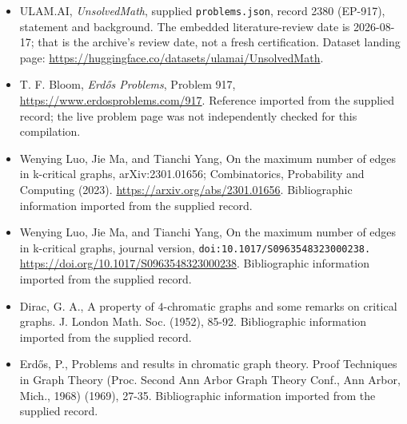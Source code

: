 \documentclass[11pt,a4paper]{article}
\begin{document}
{\small

\begin{itemize}

\item[\hypertarget{source:2380:1}{S1}] ULAM.AI, \emph{UnsolvedMath}, supplied \texttt{problems.json}, record 2380 (EP-917), statement and background. The embedded literature-review date is 2026-08-17; that is the archive’s review date, not a fresh certification. Dataset landing page: \url{https://huggingface.co/datasets/ulamai/UnsolvedMath}.

\item[\hypertarget{source:2380:2}{S2}] T. F. Bloom, \emph{Erdős Problems}, Problem 917, \url{https://www.erdosproblems.com/917}. Reference imported from the supplied record; the live problem page was not independently checked for this compilation.

\item[\hypertarget{source:2380:3}{S3}] Wenying Luo, Jie Ma, and Tianchi Yang, On the maximum number of edges in k-critical graphs, arXiv:2301.01656; Combinatorics, Probability and Computing (2023). \url{https://arxiv.org/abs/2301.01656}. Bibliographic information imported from the supplied record.

\item[\hypertarget{source:2380:4}{S4}] Wenying Luo, Jie Ma, and Tianchi Yang, On the maximum number of edges in k-critical graphs, journal version, \nolinkurl{doi:10.1017/S0963548323000238.} \url{https://doi.org/10.1017/S0963548323000238}. Bibliographic information imported from the supplied record.

\item[\hypertarget{source:2380:5}{S5}] Dirac, G. A., A property of {$4$}-chromatic graphs and some remarks on critical graphs. J. London Math. Soc. (1952), 85-92. Bibliographic information imported from the supplied record.

\item[\hypertarget{source:2380:6}{S6}] Erd\H{o}s, P., Problems and results in chromatic graph theory. Proof Techniques in Graph Theory (Proc. Second Ann Arbor Graph Theory Conf., Ann Arbor, Mich., 1968) (1969), 27-35. Bibliographic information imported from the supplied record.

\end{itemize}

}

\label{end:2380}
\end{document}
